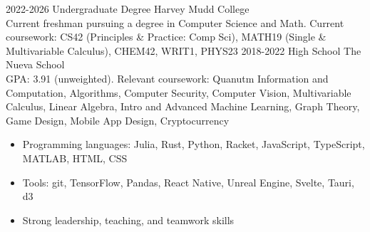 \documentclass[9pt]{developercv} %
\begin{document}


\begin{entrylist}
	\entry
		{2022-2026}
		{Undergraduate Degree}
		{Harvey Mudd College}
		{\\Current freshman pursuing a degree in Computer Science and Math. Current coursework: CS42 (Principles \& Practice: Comp Sci), MATH19 (Single \& Multivariable Calculus), CHEM42, WRIT1, PHYS23}
	\entry
		{2018-2022}
		{High School}
		{The Nueva School}
		{\\GPA: 3.91 (unweighted). Relevant coursework: Quanutm Information and Computation, Algorithms, Computer Security, Computer Vision, Multivariable Calculus, Linear Algebra, Intro and Advanced Machine Learning, Graph Theory, Game Design, Mobile App Design, Cryptocurrency}
\end{entrylist}



\begin{itemize}[noitemsep, topsep=0pt]
	\item Programming languages: Julia, Rust, Python, Racket, JavaScript, TypeScript, MATLAB, HTML, CSS
	\item Tools: git, TensorFlow, Pandas, React Native, Unreal Engine, Svelte, Tauri, d3 
	\item Strong leadership, teaching, and teamwork skills
\end{itemize}
\end{document}
